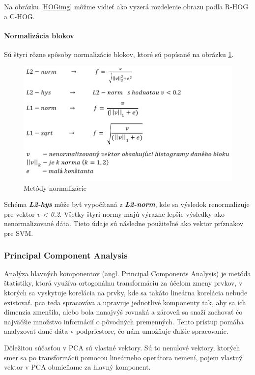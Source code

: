 Na obrázku \ref{HOGimg} môžme vidieť ako vyzerá rozdelenie obrazu podľa R-HOG a C-HOG.

\paragraph{Normalizácia blokov}
Sú štyri rôzne spôsoby normalizácie blokov, ktoré sú popísané na obrázku \ref{HOGnorm}.

\begin{figure}[H]
  \centering
  \includegraphics[width=14cm]{img/HOGnorm.png}
  \caption{Metódy normalizácie}
  \label{HOGnorm}
\end{figure}

Schéma \textbf{\textit{L2-hys}} môže byť vypočítaná z \textbf{\textit{L2-norm}}, kde sa výsledok renormalizuje pre vektor \textit{v < 0.2}. Všetky štyri normy majú výrazne lepšie výsledky ako nenormalizované dáta. Tieto údaje sú následne použiteľné ako vektor príznakov pre SVM. \cite{c11}


\subsubsection{Principal Component Analysis} \label{PCAlabel}
Analýza hlavných komponentov (angl. Principal Components Analysis) je metóda štatistiky, ktorá využíva ortogonálnu transformáciu za účelom zmeny prvkov, v ktorých sa vyskytuje korelácia na prvky, kde  sa takáto lineárna korelácia nebude existovať. \acrshort{pca} teda spracováva a upravuje jednotlivé komponenty tak, aby sa ich dimenzia zmenšila, alebo bola nanajvýš rovnaká a zároveň sa snaží zachovať čo najväčšie množstvo informácií o pôvodných premenných. Tento prístup pomáha analyzovať dané dáta v podpriestore, čo nám umožňuje ďalšie spracovanie.

Dôležitou súčasťou v PCA sú vlastné vektory. Sú to nenulové vektory, ktorých smer sa po transformácii pomocou lineárneho operátora nemení, pojem vlastný vektor v PCA obmieňame za hlavný komponent. 

